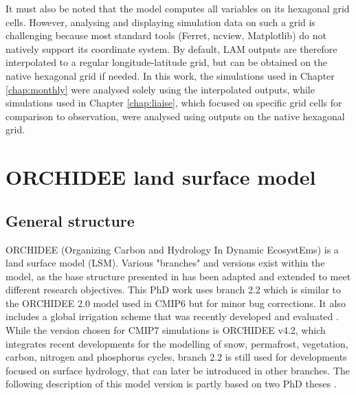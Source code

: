 It must also be noted that the model computes all variables on its hexagonal grid cells. However, analysing and displaying simulation data on such a grid is challenging because most standard tools (Ferret, ncview, Matplotlib) do not natively support its coordinate system. 
By default, LAM outputs are therefore interpolated to a regular longitude-latitude grid, but can be obtained on the native hexagonal grid if needed.
In this work, the simulations used in Chapter \ref{chap:monthly} were analysed solely using the interpolated outputs, while simulations used in Chapter \ref{chap:liaise}, which focused on specific grid cells for comparison to observation, were analysed using outputs on the native hexagonal grid.%

\section{ORCHIDEE land surface model}
\subsection{General structure}
ORCHIDEE (Organizing Carbon and Hydrology In Dynamic EcosystEms) is a land surface model (LSM). Various "branches" and versions exist within the model, as the base structure presented in \citet{krinner_dynamic_2005} has been adapted and extended to meet different research objectives. 
This PhD work uses branch 2.2 which is similar to the ORCHIDEE 2.0 model used in CMIP6 \citep{cheruy_improved_2020, boucher_presentation_2020} but for minor bug corrections. It also includes a global irrigation scheme that was recently developed and evaluated \citep{arboleda-obando_validation_2024}. While the version chosen for CMIP7 simulations is ORCHIDEE v4.2, which integrates recent developments for the modelling of snow, permafrost, vegetation, carbon, nitrogen and phosphorus cycles, branch 2.2 is still used for developments focused on surface hydrology, that can later be introduced in other branches.
The following description of this model version is partly based on two PhD theses \citep{campoy_influence_2013,arboleda-obando_feedback_2023}.

